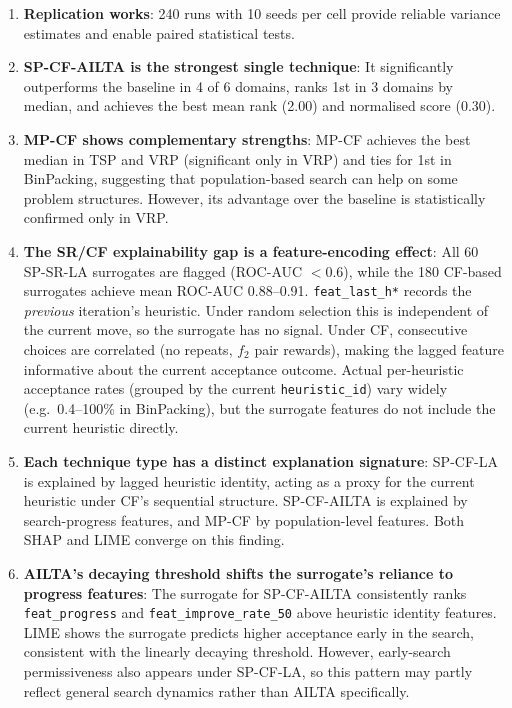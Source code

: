 \documentclass[11pt,a4paper]{article}
\begin{document}
\begin{enumerate}
  \item \textbf{Replication works}: 240 runs with 10 seeds per cell provide reliable
    variance estimates and enable paired statistical tests.

  \item \textbf{SP-CF-AILTA is the strongest single technique}: It significantly
    outperforms the baseline in 4 of 6 domains, ranks 1st in 3 domains by median,
    and achieves the best mean rank (2.00) and normalised score (0.30).

  \item \textbf{MP-CF shows complementary strengths}: MP-CF achieves the best median
    in TSP and VRP (significant only in VRP) and ties for 1st in BinPacking, suggesting that
    population-based search can help on some problem structures. However, its
    advantage over the baseline is statistically confirmed only in VRP.

  \item \textbf{The SR/CF explainability gap is a feature-encoding effect}:
    All 60 SP-SR-LA surrogates are flagged (ROC-AUC $< 0.6$), while the
    180 CF-based surrogates achieve mean ROC-AUC 0.88--0.91.
    \texttt{feat\_last\_h*} records the \emph{previous} iteration's heuristic.
    Under random selection this is independent of the current move, so
    the surrogate has no signal. Under CF, consecutive choices are
    correlated (no repeats, $f_2$ pair rewards), making the lagged
    feature informative about the current acceptance outcome. Actual
    per-heuristic acceptance rates (grouped by the current
    \texttt{heuristic\_id}) vary widely (e.g.\ 0.4--100\% in BinPacking),
    but the surrogate features do not include the current heuristic
    directly.

  \item \textbf{Each technique type has a distinct explanation signature}: SP-CF-LA is
    explained by lagged heuristic identity, acting as a proxy for the current
    heuristic under CF's sequential structure. SP-CF-AILTA is explained by
    search-progress features, and MP-CF by population-level features. Both
    SHAP and LIME converge on this finding.

  \item \textbf{AILTA's decaying threshold shifts the surrogate's
    reliance to progress features}: The surrogate for SP-CF-AILTA
    consistently ranks \texttt{feat\_progress} and
    \texttt{feat\_improve\_\allowbreak{}rate\_50} above heuristic
    identity features. LIME shows the surrogate predicts higher acceptance
    early in the search, consistent with the linearly decaying threshold.
    However, early-search permissiveness also appears under SP-CF-LA, so
    this pattern may partly reflect general search dynamics rather than
    AILTA specifically.


\end{enumerate}
\end{document}
